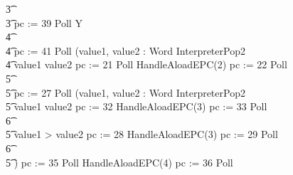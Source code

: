 \begin{figure}[t!]
\begin{circus}
    \t3 {} \cdots {} \\
    \t3 pc := 39 \circseq Poll \circseq \circmu Y \circspot \\
    \t4 {} \cdots {} \\
    \t4 pc := 41 \circseq Poll \circseq (\circvar value1, value2 : Word \circspot InterpreterPop2 \circseq \\
    \t4 \circif value1 \leq value2 \circthen pc := 21 \circseq Poll \circseq HandleAloadEPC(2) \circseq pc := 22 \circseq Poll \circseq \\
    \t5 {} \cdots {} \\
    \t5 pc := 27 \circseq Poll \circseq (\circvar value1, value2 : Word \circspot InterpreterPop2 \circseq \\
    \t5 \circif value1 \leq value2 \circthen pc := 32 \circseq HandleAloadEPC(3) \circseq pc := 33 \circseq Poll \circseq \\
    \t6 {} \cdots {} \\
    \t5 {} \circelse value1 > value2 \circthen pc := 28 \circseq HandleAloadEPC(3) \circseq pc := 29 \circseq Poll \circseq \\
    \t6 {} \cdots {} \\
    \t5 \circfi) \circseq pc := 35 \circseq Poll \circseq HandleAloadEPC(4) \circseq pc := 36 \circseq Poll \circseq \\

\end{circus}
\end{figure}
